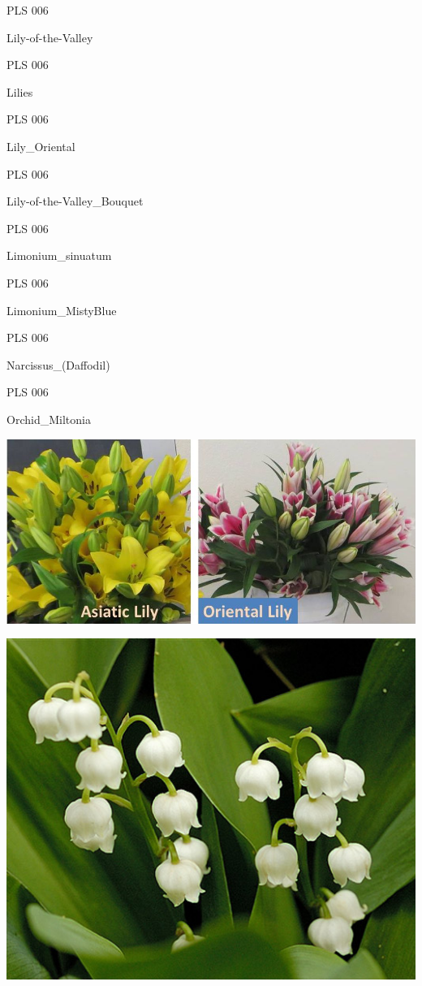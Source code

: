 \documentclass{article}
\begin{document}
\noindent  PLS 006
\vfill
\centerline{{\huge Lily-of-the-Valley }}
\vfill
\newpage

\noindent  PLS 006
\vfill
\centerline{{\huge Lilies }}
\vfill
\newpage

\noindent  PLS 006
\vfill
\centerline{{\huge Lily\_Oriental }}
\vfill
\newpage

\noindent  PLS 006
\vfill
\centerline{{\huge Lily-of-the-Valley\_Bouquet }}
\vfill
\newpage

\noindent  PLS 006
\vfill
\centerline{{\huge Limonium\_sinuatum }}
\vfill
\newpage

\noindent  PLS 006
\vfill
\centerline{{\huge Limonium\_MistyBlue }}
\vfill
\newpage

\noindent  PLS 006
\vfill
\centerline{{\huge Narcissus\_(Daffodil) }}
\vfill
\newpage

\noindent  PLS 006
\vfill
\centerline{{\huge Orchid\_Miltonia }}
\vfill
\newpage

\begin{center}
\includegraphics[height=0.925\paperheight]{../Lilies.jpg}
\end{center}
\newpage

\begin{center}
\includegraphics[height=0.925\paperheight]{../Lily-of-the-Valley.jpg}
\end{center}
\newpage
\end{document}

